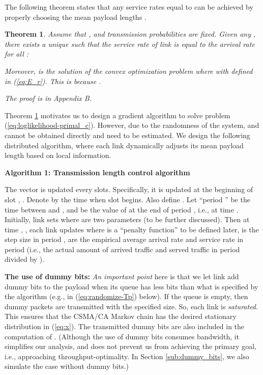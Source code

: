 \documentclass{IEEEtran}
\newtheorem{thm}{Theorem}
\begin{document}
The following theorem states that any service rates equal to 
can be achieved by properly choosing the mean payload lengths .
\begin{thm}
\label{thm:thu-optimal}Assume that , and transmission
probabilities  are fixed. Given any ,
there exists a unique  such that the
service rate of link  is equal to the arrival rate for all :



Moreover,  is the solution of the convex optimization
problem
where 
with  defined in (\ref{eq:E_r}). This is because .

The proof is in Appendix B.
\end{thm}
Theorem \ref{thm:thu-optimal} motivates us to design a gradient algorithm
to solve problem (\ref{eq:loglikelihood-primal_c}). However, due
to the randomness of the system,  and 
cannot be obtained directly and need to be estimated. We design the
following distributed algorithm, where each link  dynamically
adjusts its mean payload length  based on local information.
\smallskip{}


\textbf{Algorithm 1: Transmission length control algorithm}

\medskip{}


The vector  is updated every  slots. Specifically, it
is updated at the beginning of slot , . Denote
by  the time when slot  begins. Also define .
Let {}``period '' be the time between  and ,
and  be the value of  at the end of period
, i.e., at time . Initially, link  sets 
where  are two parameters (to be further discussed).
Then at time , , each link  updates 
where  is a {}``penalty function'' to be defined
later,  is the step size in period , 
are the empirical average arrival rate and service rate in period
 (i.e., the actual amount of arrived traffic and served traffic
in period  divided by ). 

\textbf{The use of dummy bits:}\emph{ An important point} here is
that we let link  add dummy bits to the payload when its queue
has less bits than what is specified by the algorithm (e.g., in (\ref{eq:randomize-Tp})
below). If the queue is empty, then dummy packets are transmitted
with the specified size. So, each link is \emph{saturated}. This ensures
that the CSMA/CA Markov chain has the desired stationary distribution
in (\ref{eq:x}). The transmitted dummy bits are also included in
the computation of . (Although the use of dummy bits consumes
bandwidth, it simplifies our analysis, and does not prevent us from
achieving the primary goal, i.e., approaching throughput-optimality.
In Section \ref{sub:dummy_bits}, we also simulate the case without
dummy bits.) 
\end{document}
